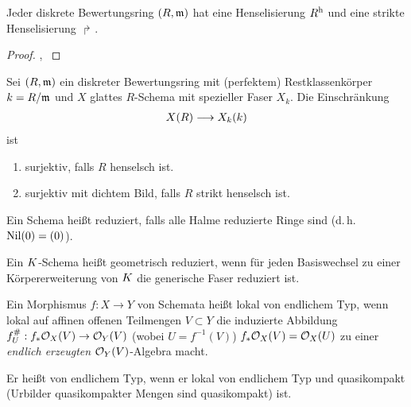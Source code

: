 \documentclass[german]{scrreprt}
\begin{document}
\begin{Satz}\label{thm:exhenselisierung}
  Jeder diskrete Bewertungsring $(R,\mathfrak{m})$ hat eine Henselisierung $R^{\text{h}}$
  und eine strikte Henselisierung $\Rsh$.
  \cite[Proposition IV.6.5]{silverman2}
  \begin{proof}
    \cite[Proposition IV.6.5]{silverman2},
    \cite[Remark IV.6.6.2]{silverman2}
    \cite[Chapter 2.3, S. 48]{neron}
  \end{proof}
\end{Satz}

\begin{Satz}\label{thm:eigstrikthenselsch}
  Sei $(R,\mathfrak{m})$ ein diskreter Bewertungsring mit (perfektem)
  Restklassenkörper $k=R/\mathfrak{m}$ und $X$ glattes $R$-Schema mit spezieller
  Faser $X_k$.
  Die Einschränkung
  \begin{gather*}
    X(R)\longrightarrow X_k(k)
  \end{gather*}
  ist
  \begin{enumerate}[label=(\roman*)]
  \item surjektiv, falls $R$ henselsch ist.
  \item surjektiv mit dichtem Bild, falls $R$ strikt henselsch ist.
  \end{enumerate}
  \cite[Proposition IV.6.4]{silverman2}
\end{Satz}


\begin{Definition}
  Ein Schema heißt reduziert, falls alle Halme reduzierte Ringe sind
  (d.\,h. $\operatorname{Nil}(0)=(0)$).

  Ein $K$-Schema heißt geometrisch reduziert, wenn für jeden
  Basiswechsel zu einer Körpererweiterung von $K$ die generische
  Faser reduziert ist. 
\end{Definition}


\begin{Definition}
  Ein Morphismus $f\colon X\to Y$ von Schemata heißt lokal von endlichem
  Typ, wenn lokal auf affinen offenen Teilmengen $V\subset Y$ die
  induzierte Abbildung $f_U^\#: f_\ast\mathcal{O}_X(V)\to \mathcal{O}_Y(V)$
  (wobei $U=f^{-1}(V)$) $f_\ast\mathcal{O}_X(V)=\mathcal{O}_X(U)$ zu einer \emph{endlich erzeugten}
  $\mathcal{O}_Y(V)$-Algebra macht.

  Er heißt von endlichem Typ, wenn er lokal von endlichem Typ und
  quasikompakt (Urbilder quasikompakter Mengen sind quasikompakt) ist.
\end{Definition}
\end{document}
